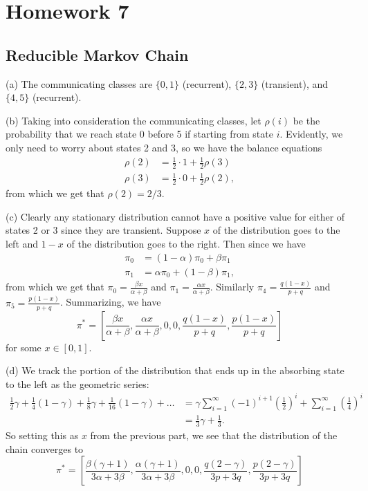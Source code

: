 \section{Homework 7}

\subsection{Reducible Markov Chain}
(a) The communicating classes are $\{0, 1\}$ (recurrent), $\{2, 3\}$ (transient), and $\{4, 5\}$ (recurrent).

(b) Taking into consideration the communicating classes, let $\rho(i)$ be the probability that we reach state 0 before 5 if starting from state $i$. Evidently, we only need to worry about states 2 and 3, so we have the balance equations
\begin{align*}
    \rho(2) &= \frac{1}{2} \cdot 1 + \frac{1}{2}\rho(3) \\
    \rho(3) &= \frac{1}{2} \cdot 0 + \frac{1}{2}\rho(2),
\end{align*}
from which we get that $\rho(2) = 2/3$.

(c) Clearly any stationary distribution cannot have a positive value for either of states 2 or 3 since they are transient. Suppose $x$ of the distribution goes to the left and $1 - x$ of the distribution goes to the right. Then since we have
\begin{align*}
    \pi_0 &= (1 - \alpha)\pi_0 + \beta\pi_1 \\
    \pi_1 &= \alpha\pi_0 + (1 - \beta)\pi_1,
\end{align*}
from which we get that $\pi_0 = \frac{\beta x}{\alpha + \beta}$ and $\pi_1 = \frac{\alpha x}{\alpha + \beta}$. Similarly $\pi_4 = \frac{q(1 - x)}{p + q}$ and $\pi_5 = \frac{p(1 - x)}{p + q}$. Summarizing, we have
\[
\pi^* = \left[\frac{\beta x}{\alpha + \beta}, \frac{\alpha x}{\alpha + \beta}, 0, 0, \frac{q(1 - x)}{p + q}, \frac{p(1 - x)}{p + q}\right]
\]
for some $x \in [0, 1]$.

(d) We track the portion of the distribution that ends up in the absorbing state to the left as the geometric series:
\begin{align*}
    \frac{1}{2}\gamma + \frac{1}{4}(1 - \gamma) + \frac{1}{8}\gamma + \frac{1}{16}(1 - \gamma) + \dots &= \gamma\sum_{i = 1}^\infty (-1)^{i + 1}\left(\frac{1}{2}\right)^i + \sum_{i = 1}^\infty\left(\frac{1}{4}\right)^i \\
    &= \frac{1}{3}\gamma + \frac{1}{3}.
\end{align*}
So setting this as $x$ from the previous part, we see that the distribution of the chain converges to
\[
\pi^* = \left[\frac{\beta(\gamma + 1)}{3\alpha + 3\beta}, \frac{\alpha(\gamma + 1)}{3\alpha + 3\beta}, 0, 0, \frac{q(2 - \gamma)}{3p + 3q}, \frac{p(2 - \gamma)}{3p + 3q}\right]
\]

